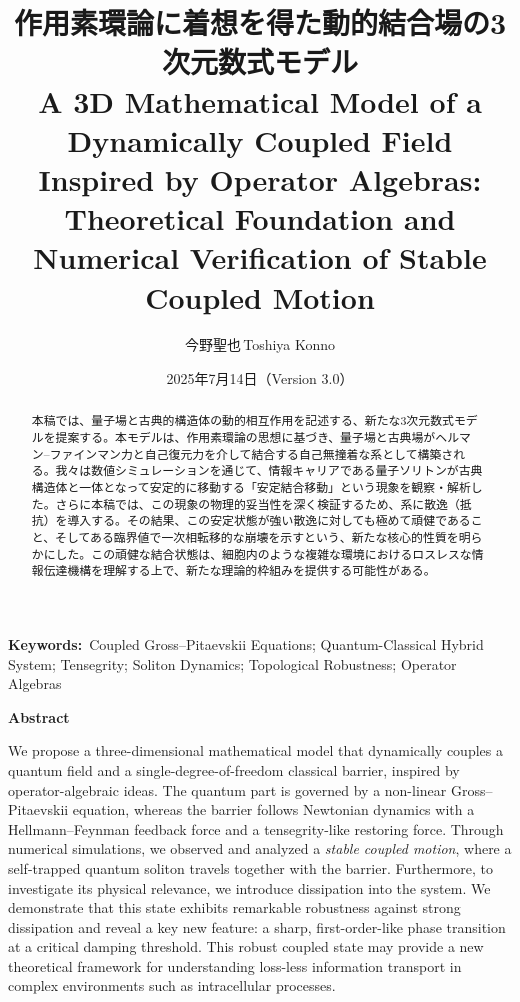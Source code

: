 \documentclass[a4paper,11pt,ja=standard]{bxjsarticle}
\title{作用素環論に着想を得た動的結合場の3次元数式モデル\\
\large A 3D Mathematical Model of a Dynamically Coupled Field Inspired by Operator Algebras: Theoretical Foundation and Numerical Verification of Stable Coupled Motion}
\author[1]{今野聖也\,Toshiya Konno}
\affil[1]{Independent Researcher\\\href{mailto:ktlifeisonlyreallyoverafter60@gmail.com}{ktlifeisonlyreallyoverafter60@gmail.com}}
\date{2025年7月14日（Version 3.0）}
\begin{document}
\maketitle

\noindent\textbf{Keywords:}\ Coupled Gross–Pitaevskii Equations; Quantum-Classical Hybrid System; Tensegrity; Soliton Dynamics; Topological Robustness; Operator Algebras

\begin{abstract}
\noindent 本稿では、量子場と古典的構造体の動的相互作用を記述する、新たな3次元数式モデルを提案する。本モデルは、作用素環論の思想に基づき、量子場と古典場がヘルマン–ファインマン力と自己復元力を介して結合する自己無撞着な系として構築される。我々は数値シミュレーションを通じて、情報キャリアである量子ソリトンが古典構造体と一体となって安定的に移動する「安定結合移動」という現象を観察・解析した。さらに本稿では、この現象の物理的妥当性を深く検証するため、系に散逸（抵抗）を導入する。その結果、この安定状態が強い散逸に対しても極めて頑健であること、そしてある臨界値で一次相転移的な崩壊を示すという、新たな核心的性質を明らかにした。この頑健な結合状態は、細胞内のような複雑な環境におけるロスレスな情報伝達機構を理解する上で、新たな理論的枠組みを提供する可能性がある。
\end{abstract}

\vspace{1em}
\noindent\textbf{Abstract}
\par\noindent
\small
We propose a three-dimensional mathematical model that dynamically couples a quantum field and a single-degree-of-freedom classical barrier, inspired by operator-algebraic ideas. The quantum part is governed by a non-linear Gross–Pitaevskii equation, whereas the barrier follows Newtonian dynamics with a Hellmann–Feynman feedback force and a tensegrity-like restoring force. Through numerical simulations, we observed and analyzed a \emph{stable coupled motion}, where a self-trapped quantum soliton travels together with the barrier. Furthermore, to investigate its physical relevance, we introduce dissipation into the system. We demonstrate that this state exhibits remarkable robustness against strong dissipation and reveal a key new feature: a sharp, first-order-like phase transition at a critical damping threshold. This robust coupled state may provide a new theoretical framework for understanding loss-less information transport in complex environments such as intracellular processes.
\vspace{2em}
\end{document}
